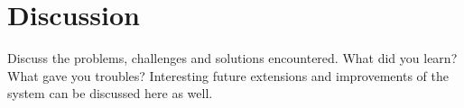\chapter{Discussion}

Discuss the problems, challenges and solutions encountered. What did you learn? What gave you troubles? Interesting future extensions and improvements of the system can be discussed here as well.


